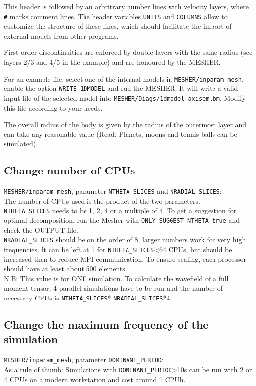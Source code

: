 \documentclass{article}
\begin{document}
This header is followed by an arbritrary number lines with velocity layers, where \verb|#| marks comment lines. The header variables \verb|UNITS| and \verb|COLUMNS| allow to customize the structure of these lines, which should facilitate the import of external models from other programs.

First order discontinuities are enforced by double layers with the same radius (see layers 2/3 and 4/5
in the example) and are honoured by the MESHER. 

For an example file, select one of the internal models in \verb|MESHER/inparam_mesh|, enable the option \verb|WRITE_1DMODEL| and run the MESHER. It will write a valid input file of the selected model into \verb|MESHER/Diags/1dmodel_axisem.bm|. Modify this file according to your needs.

The overall radius of the body is given by the radius of the outermost layer and can take
any reasonable value (Read: Planets, moons and tennis balls can be simulated).

\subsection{Change number of CPUs}

\verb|MESHER/inparam_mesh|, parameter \verb|NTHETA_SLICES| and \verb|NRADIAL_SLICES|: \\
The number of CPUs used is the product of the two parameters. \\
\verb|NTHETA_SLICES| needs to be 1, 2, 4 or a multiple of 4. To get a suggestion for
optimal decomposition, run the Mesher with \verb|ONLY_SUGGEST_NTHETA true| and check the
OUTPUT file.\\
\verb|NRADIAL_SLICES| should be on the order of 8, larger numbers work for very high
frequencies. It can be left at 1 for \verb|NTHETA_SLICES|<64 CPUs, but should be increased
then to reduce MPI communication. To ensure scaling, each processor should have at least
about 500 elements.\\
N.B: This value is for ONE simulation. To calculate the wavefield of a full moment tensor,
4 parallel simulations have to be run and the number of necessary CPUs is
\verb|NTHETA_SLICES|* \verb|NRADIAL_SLICES|*4. 


\subsection{Change the maximum frequency of the simulation}
\verb|MESHER/inparam_mesh|, parameter \verb|DOMINANT_PERIOD|: \\
As a rule of thumb: Simulations with \verb|DOMINANT_PERIOD|>10s can be run with 2 or 4
CPUs on a modern workstation and cost around 1 CPUh.
\end{document}
